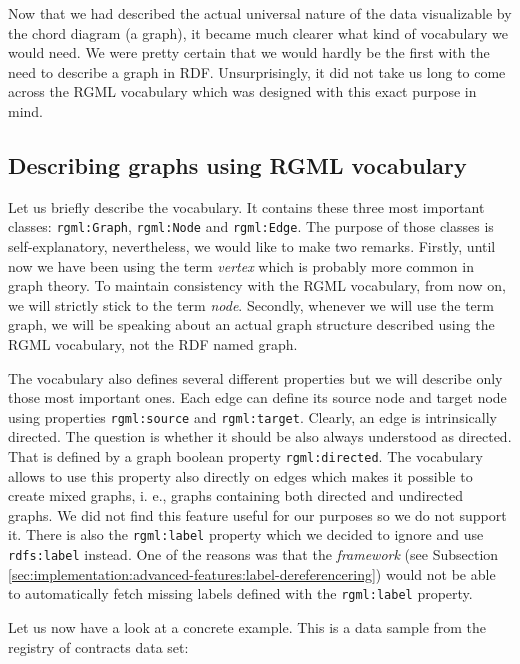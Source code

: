 Now that we had described the actual universal nature of the data visualizable by the chord diagram (a graph), it became much clearer what kind of vocabulary we would need. We were pretty certain that we would hardly be the first with the need to describe a graph in RDF. Unsurprisingly, it did not take us long to come across the RGML vocabulary \cite{rgml} which was designed with this exact purpose in mind.

\subsection{Describing graphs using RGML vocabulary}
\label{sec:visualizers:chord:rgml}

Let us briefly describe the vocabulary. It contains these three most important classes: \texttt{rgml:Graph}, \texttt{rgml:Node} and \texttt{rgml:Edge}. The purpose of those classes is self-explanatory, nevertheless, we would like to make two remarks. Firstly, until now we have been using the term \emph{vertex} which is probably more common in graph theory. To maintain consistency with the RGML vocabulary, from now on, we will strictly stick to the term \emph{node}. Secondly, whenever we will use the term graph, we will be speaking about an actual graph structure described using the RGML vocabulary, not the RDF named graph.

The vocabulary also defines several different properties but we will describe only those most important ones. Each edge can define its source node and target node using properties \texttt{rgml:source} and \texttt{rgml:target}. Clearly, an edge is intrinsically directed. The question is whether it should be also always understood as directed. That is defined by a graph boolean property \texttt{rgml:directed}. The vocabulary allows to use this property also directly on edges which makes it possible to create mixed graphs, i. e., graphs containing both directed and undirected graphs. We did not find this feature useful for our purposes so we do not support it. There is also the \texttt{rgml:label} property which we decided to ignore and use  \texttt{rdfs:label} instead. One of the reasons was that the \emph{framework} (see Subsection \ref{sec:implementation:advanced-features:label-dereferencering}) would not be able to automatically fetch missing labels defined with the \texttt{rgml:label} property.

Let us now have a look at a concrete example. This is a data sample from the registry of contracts data set:

